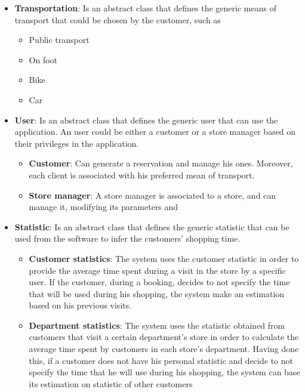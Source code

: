\documentclass{article}
\begin{document}
			\begin{itemize}
				\item {\bfseries Transportation}: Is an abstract class that defines the generic means of transport that could be chosen by the customer, such as
				
					\begin{itemize}
						\item Public transport
						\item On foot
						\item Bike
						\item Car
					\end{itemize}
				
				\item {\bfseries User}: Is an abstract class that defines the generic user that can use the application. An user could be either a customer or a store manager based on their privileges in the application.
				
					\begin{itemize}
						\item {\bfseries Customer}: Can generate a reservation and manage his ones. Moreover, each client is associated with his preferred mean of transport.						
						\item {\bfseries Store manager}: A store manager is associated to a store, and can manage it, modifying its parameters and 
					\end{itemize}
				
				\item {\bfseries Statistic}: Is an abstract class that defines the generic statistic that can be used from the software to infer the customers' shopping time.			
				\begin{itemize}
					\item {\bfseries Customer statistics}: The system uses the customer statistic in order to provide the average time spent during a visit in the store by a specific user. If the customer, during a booking, decides to not specify the time that will be used during his shopping, the system make an estimation based on his previous visits.
					
					\item {\bfseries Department statistics}: The system uses the statistic obtained from customers that visit a certain department's store in order to calculate the average time spent by customers in each store's department. Having done this, if a customer does not have his personal statistic and decide to not specify the time that he will use during his shopping, the system can base its estimation on statistic of other customers 
				

\end{itemize}
\end{itemize}
\end{document}
